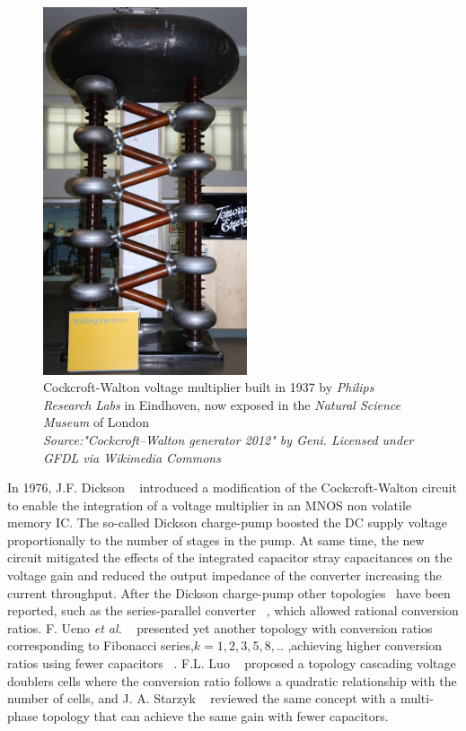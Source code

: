 \begin{figure}[!h]
\centering
 \includegraphics[width=6cm]{./1_modeling/img/CockcroftWaltonGenerator.jpg}
\caption{Cockcroft-Walton voltage multiplier built in 1937 by \emph{Philips Research Labs} in Eindhoven, now exposed in the \emph{Natural Science Museum} of London\\
\emph{Source:"Cockcroft–Walton generator 2012" by Geni. Licensed under GFDL via Wikimedia Commons  %
}}
\label{fig:Cockcroft_VMR}
\end{figure}


In 1976, J.F. Dickson ~\cite{76Dickson} introduced a modification of the Cockcroft-Walton circuit to enable the integration of a voltage multiplier in an MNOS non volatile memory IC. The so-called Dickson charge-pump boosted the DC supply voltage proportionally to the number of stages in the pump. At same time, the new circuit mitigated the effects of the integrated capacitor stray capacitances on the voltage gain and reduced the output impedance of the converter increasing the current throughput. After the Dickson charge-pump other topologies~\cite{Seeman:EECS-2009-78} have been reported, such as the series-parallel converter ~\cite{94Ngo,94Cheong}, which allowed rational conversion ratios. F. Ueno \textit{et al.} ~\cite{91Ueno} presented yet another topology with conversion ratios corresponding to Fibonacci series,$k=1,2,3,5,8,..$ ,achieving higher conversion ratios using fewer capacitors ~\cite{95Makowski,09Allasasmeh}.  F.L. Luo  ~\cite{02Luo} proposed a topology cascading voltage doublers cells where the conversion ratio follows a quadratic relationship with the number of cells, and J. A. Starzyk ~\cite{01Starzyk} reviewed the same concept with a multi-phase topology that can achieve the same gain with fewer capacitors.



